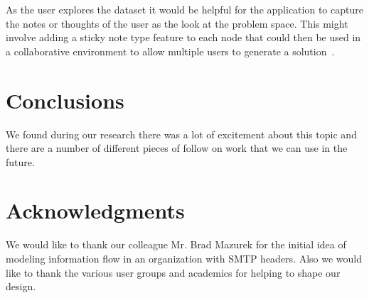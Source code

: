 \documentclass[journal]{vgtc}                %
\begin{document}
As the user explores the dataset it would be helpful for the application to capture the notes or thoughts of the user as the look at the problem space.  This might involve adding a sticky note type feature to each node that could then be used in a collaborative environment to allow multiple users to generate a solution~\cite{ware2012information}.

\section{Conclusions}
\label{sec:conclusions}

We found during our research there was a lot of excitement about this topic and there are a number of different pieces of follow on work that we can use in the future.

\section{Acknowledgments}
We would like to thank our colleague Mr. Brad Mazurek for the initial idea of modeling information flow in an organization with SMTP headers. Also we would like to thank the various user groups and academics for helping to shape our design.



\end{document}
